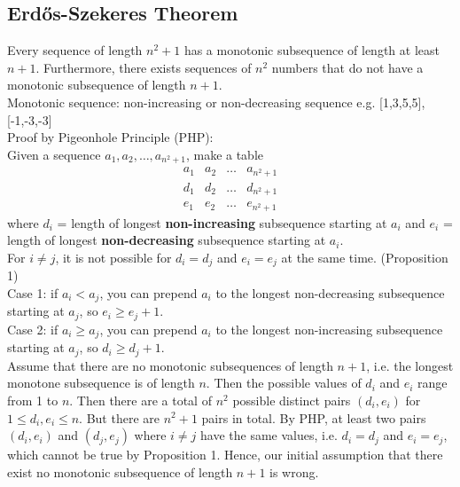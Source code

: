 \documentclass[12pt]{extarticle}
\begin{document}
\doublespacing

\pagestyle{fancy}
\fancyhf{}
\renewcommand{\headrulewidth}{0pt}


\subsection*{Erdős-Szekeres Theorem}
Every sequence of length $n^2+1$ has a monotonic subsequence of length at least $n+1$. Furthermore, there exists sequences of $n^2$ numbers that do not have a monotonic subsequence of length $n+1$. \\
Monotonic sequence: non-increasing or non-decreasing sequence e.g. [1,3,5,5], [-1,-3,-3]\\ 
Proof by Pigeonhole Principle (PHP): \\
Given a sequence $a_1,a_2,\dots,a_{n^2+1}$, make a table $$\begin{matrix}a_1 & a_2 & \dots & a_{n^2+1}\\ \hline d_1 & d_2 & \dots & d_{n^2+1}\\ \hline e_1 & e_2 & \dots & e_{n^2+1} \end{matrix}$$
where $d_i$ = length of longest \textbf{non-increasing} subsequence starting at $a_i$ and $e_i$ = length of longest \textbf{non-decreasing} subsequence starting at $a_i$. \\
For $i\not=j$, it is not possible for $d_i=d_j$ and $e_i=e_j$ at the same time. (Proposition 1) \\
Case 1: if $a_i<a_j$, you can prepend $a_i$ to the longest non-decreasing subsequence starting at $a_j$, so $e_i\geq e_j+1$. \\
Case 2: if $a_i\geq a_j$, you can prepend $a_i$ to the longest non-increasing subsequence starting at $a_j$, so $d_i \geq d_j+1$.\\
Assume that there are no monotonic subsequences of length $n+1$, i.e. the longest monotone subsequence is of length $n$. Then the possible values of $d_i$ and $e_i$ range from 1 to $n$. Then there are a total of $n^2$ possible distinct pairs $(d_i,e_i)$ for $1\leq d_i,e_i\leq n$. But there are $n^2+1$ pairs in total. By PHP, at least two pairs $(d_i,e_i)$ and $(d_j,e_j)$ where $i\not=j$ have the same values, i.e. $d_i=d_j$ and $e_i=e_j$, which cannot be true by Proposition 1. Hence, our initial assumption that there exist no monotonic subsequence of length $n+1$ is wrong.\\
\end{document}
